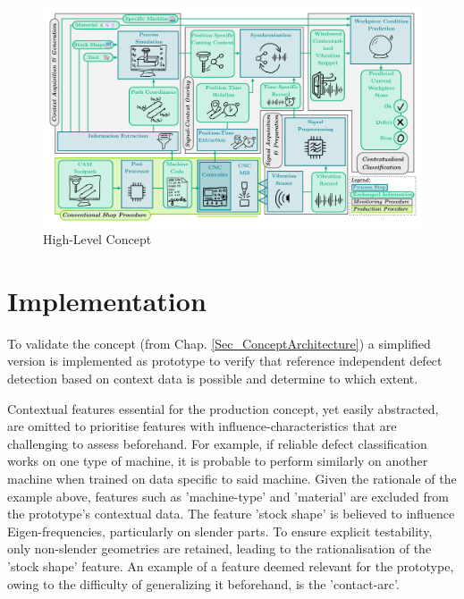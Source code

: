 \documentclass[5p,times,procedia]{elsarticle}
\begin{document}
\begin{figure}[t]
    \centering
    \includegraphics[width=0.99\linewidth]{ConceptDiagram.pdf}
    \caption{High-Level Concept}
    \label{Fig_ConceptDiagram}
\end{figure}
 





\section{Implementation}

To validate the concept (from Chap. \ref{Sec_ConceptArchitecture}) a simplified version is implemented as prototype to verify that reference independent defect detection based on context data is possible and determine to which extent.

Contextual features essential for the production concept, yet easily abstracted, are omitted to prioritise features with influence-characteristics that are challenging to assess beforehand. For example, if reliable defect classification works on one type of machine, it is probable to perform similarly on another machine when trained on data specific to said machine.
Given the rationale of the example above, features such as 'machine-type' and 'material' are excluded from the prototype's contextual data.
The feature 'stock shape' is believed to influence Eigen-frequencies, particularly on slender parts. To ensure explicit testability, only non-slender geometries are retained, leading to the rationalisation of the 'stock shape' feature.
An example of a feature deemed relevant for the prototype, owing to the difficulty of generalizing it beforehand, is the 'contact-arc'.
\end{document}
